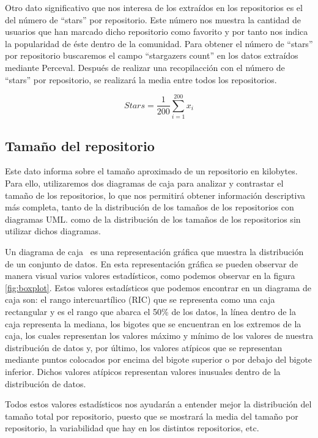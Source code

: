 \documentclass[a4paper, 12pt]{book}
\begin{document}
Otro dato significativo que nos interesa de los extraídos en los repositorios es el del número de ``stars'' por repositorio.
Este número nos muestra la cantidad de usuarios que han marcado dicho repositorio como favorito y por tanto nos indica la popularidad de éste dentro de la comunidad. 
Para obtener el número de ``stars'' por repositorio buscaremos el campo ``stargazers count'' en los datos extraídos mediante Perceval. 
Después de realizar una recopilacción con el número de ``stars'' por repositorio, se realizará la media entre todos los repositorios.

\[{Stars} = \frac{1}{200} \sum_{i=1}^{200} x_i\]


\subsection{Tamaño del repositorio} %
\label{sec:tamaño del repositorio}
Este dato informa sobre el tamaño aproximado de un repositorio en kilobytes. 
Para ello, utilizaremos dos diagramas de caja para analizar y contrastar el tamaño de los repositorios, lo que nos permitirá obtener información descriptiva más completa, tanto de la distribución de los tamaños de los repositorios con diagramas UML. como de la distribución de los tamaños de los repositorios sin utilizar dichos diagramas.


Un diagrama de caja~\cite{neto2017boxplot} es una representación gráfica que muestra la distribución de un conjunto de datos.
En esta representación gráfica se pueden observar de manera visual varios valores estadísticos, como podemos observar en la figura \ref{fig:boxplot}.
Estos valores estadísticos que podemos encontrar en un diagrama de caja son: el rango intercuartílico (RIC) que se representa como una caja rectangular y es el rango que abarca el 50\% de los datos, la línea dentro de la caja representa la mediana, 
los bigotes que se encuentran en los extremos de la caja, los cuales representan los valores máximo y mínimo de los valores de nuestra distribución de datos y, por último, los valores atípicos que se representan mediante puntos colocados por encima del bigote superior o por debajo del bigote inferior.
Dichos valores atípicos representan valores inusuales dentro de la distribución de datos.


Todos estos valores estadísticos nos ayudarán a entender mejor la distribución del tamaño total por repositorio, puesto que se mostrará la media del tamaño por repositorio, la variabilidad que hay en los distintos repositorios, etc.
\end{document}

